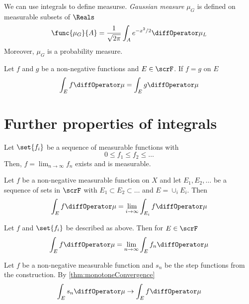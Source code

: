 We can use integrals to define measurse. \textit{Gaussian measure} \(\mu_G\) is defined on measurable subsets of \(\Reals\)
\begin{equation*}
    \func{\mu_G}{A} = \dfrac{1}{\sqrt{2\pi}} \int_{A} e^{-x^2/2} \diffOperator\mu_L
\end{equation*}
Moreover, \(\mu_G\) is a probability measure. 

\begin{corollary}
    Let \(f\) and \(g\) be a non-negative functions and \(E \in \scrF\). If \(f = g\) \alev on \(E\)
    \begin{equation*}
        \int_E f \diffOperator \mu = \int_E g \diffOperator \mu 
    \end{equation*}
\end{corollary}

\section{Further properties of integrals}
Let \(\set{f_i}\) be a sequence of measurable functions with 
\begin{equation*}
    0 \leq f_1 \leq f_2 \leq \dots 
\end{equation*}
Then, \(f = \lim_{n \to \infty} f_n\) exists and is measurable. 
\begin{lemma}
    Let \(f\) be a non-negative measurable function on \(X\) and let \(E_1, E_2,\dots \) be a sequence of sets in \(\scrF\) with \(E_1 \subset E_2 \subset \dots\) and \(E = \cup_i E_i\). Then 
    \begin{equation*}
        \int_E f \diffOperator \mu = \lim_{i \to \infty} \int_{E_i} f \diffOperator \mu 
    \end{equation*}
\end{lemma}

\begin{theorem}\label{thm:monotoneConvergence}
    Let \(f\) and \(\set{f_i}\) be described as above. Then for \(E \in \scrF\)
    \begin{equation*}
        \int_E f \diffOperator \mu = \lim_{n \to \infty} \int_E f_n \diffOperator \mu 
    \end{equation*}
\end{theorem}

\begin{remark}
    Let \(f\) be a non-negative measurable function and \(s_n\) be the step functions from the construction. By \ref{thm:monotoneConvergence} 
    \begin{equation*}
        \int_E s_n \diffOperator \mu \to \int_E f \diffOperator \mu 
    \end{equation*}
\end{remark}

